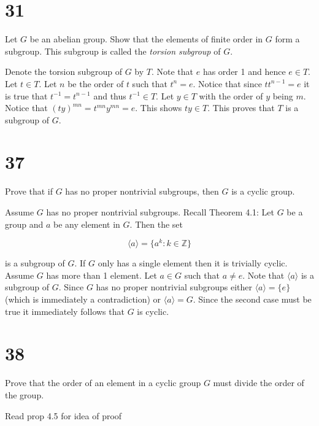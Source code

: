 \documentclass[a4paper]{article}
\begin{document}
\section*{31}


Let $G$ be an abelian group. Show that the elements of finite order in $G$ form a subgroup. This subgroup is called the \textit{torsion subgroup} of $G$.

\vspace{\baselineskip}

Denote the torsion subgroup of $G$ by $T$. Note that $e$ has order 1 and hence $e \in T$. Let $t \in T$. Let $n$ be the order of $t$ such that $t^n = e$. Notice that since $tt^{n-1} = e$ it is true that $t^{-1} = t^{n-1}$ and thus $t^{-1} \in T$. Let $y \in T$ with the order of $y$ being $m$. Notice that $(ty)^{mn} = t^{mn}y^{mn} = e$. This shows $ty \in T$. This proves that $T$ is a subgroup of $G$. 


\section*{37}

Prove that if $G$ has no proper nontrivial subgroups, then $G$ is a cyclic group.

\vspace{\baselineskip}

Assume $G$ has no proper nontrivial subgroups. Recall Theorem 4.1: Let $G$ be a group and $a$ be any element in $G$. Then the set

$$\langle a \rangle = \{ a^k : k \in \mathbb{Z} \}$$

is a subgroup of $G$. If $G$ only has a single element then it is trivially cyclic. Assume $G$ has more than 1 element. Let $a \in G$ such that $a \neq e$. Note that $\langle a \rangle$ is a subgroup of $G$. Since $G$ has no proper nontrivial subgroups either $\langle a \rangle = \{ e \}$ (which is immediately a contradiction) or $\langle a \rangle = G$. Since the second case must be true it immediately follows that $G$ is cyclic.


\section*{38}

Prove that the order of an element in a cyclic group $G$ must divide the order of the group.

\vspace{\baselineskip}

Read prop 4.5 for idea of proof
\end{document}
